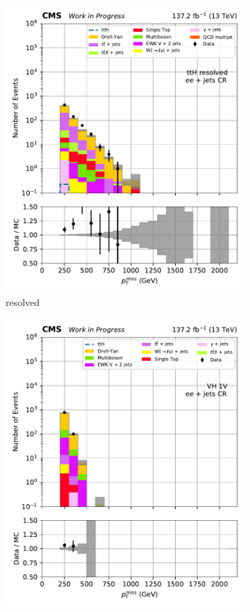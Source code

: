 \begin{figure}[htbp]
\begin{subfigure}[b]{0.24\textwidth}
        \includegraphics[width=\textwidth]{figures/region_plots/2016to18/region_4/ttH_resolved.pdf}
        \caption{\ttH resolved}
    \end{subfigure}
    \begin{subfigure}[b]{0.24\textwidth}
        \includegraphics[width=\textwidth]{figures/region_plots/2016to18/region_4/VH_1V.pdf}

\end{subfigure}
\end{figure}
